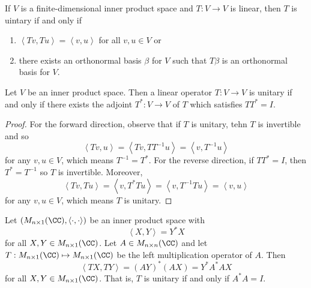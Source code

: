 \documentclass[linearalgebraII]{subfiles}
\begin{document}
    \begin{remark}
        If $V$ is a finite-dimensional inner product space and $T:V\to V$ is linear, then $T$ is uintary if and only if
        \begin{enumerate}
            \item $\left\langle Tv, Tu\right\rangle = \left\langle v, u\right\rangle$ for all $v,u\in V$ or
            \item there exists an orthonormal basis $\beta$ for $V$ such that $T\beta$ is an orthonormal basis for $V$.
        \end{enumerate}
    \end{remark}

    \begin{prop}{}
        Let $V$ be an inner product space. Then a linear operator $T:V\to V$ is unitary if and only if there exists the adjoint $T^*:V\to V$ of $T$ which satisfies $TT^* = I$.
    \end{prop}

    \begin{proof}
        For the forward direction, observe that if $T$ is unitary, tehn $T$ is invertible and so
        \begin{equation*}
            \left\langle Tv, u\right\rangle = \left\langle Tv, TT^{-1}u\right\rangle = \left\langle v, T^{-1}u\right\rangle
        \end{equation*}
        for any $v,u\in V$, which means $T^{-1} = T^*$. For the reverse direction, if $TT^* = I$, then $T^*=T^{-1}$ so $T$ is invertible. Moreover,
        \begin{equation*}
            \left\langle Tv, Tu\right\rangle = \left\langle v, T^*Tu\right\rangle = \left\langle v, T^{-1}Tu\right\rangle = \left\langle v, u\right\rangle 
        \end{equation*}
        for any $v,u\in V$, which means $T$ is unitary.
    \end{proof}

    \begin{example}
        Let $\left( M_{n\times 1}(\CC) , \left\langle \cdot, \cdot\right\rangle  \right)$ be an inner product space with
        \begin{equation*}
            \left\langle X, Y\right\rangle = Y^*X
        \end{equation*}
        for all $X,Y\in M_{n\times 1}(\CC)$. Let $A\in M_{n\times n}(\CC)$ and let $T:M_{n\times 1}(\CC)\mapsto M_{n\times 1}(\CC)$ be the left multiplication operator of $A$. Then
        \begin{equation*}
            \left\langle TX, TY\right\rangle = \left( AY \right) ^*\left( AX \right) = Y^*A^*AX
        \end{equation*}
        for all $X,Y\in M_{n\times 1}(\CC)$. That is, $T$ is unitary if and only if $A^*A=I$.
    \end{example}
\end{document}
